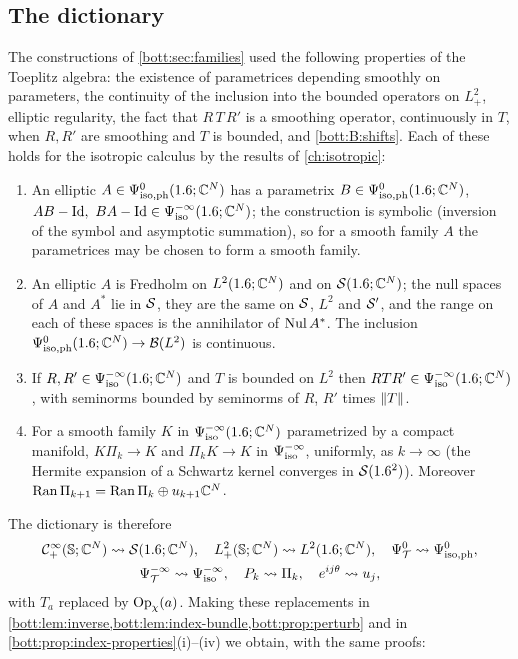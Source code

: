 \subsection{The dictionary}
The constructions of \cref{bott:sec:families} used the following properties of the
Toeplitz algebra: the existence of parametrices depending smoothly on parameters,
the continuity of the inclusion into the bounded operators on $L^2_+$, elliptic
regularity, the fact that $R\,T\,R'$ is a smoothing operator, continuously in $T$, when
$R,R'$ are smoothing and $T$ is bounded, and \ref{bott:B:shifts}. Each of these holds
for the isotropic calculus by the results of \cref{ch:isotropic}:
\begin{enumerate}[label=(I\arabic*),leftmargin=*]
\item\label{bott:I:parametrix} An elliptic $A\in\Psi^{0}_{\mathrm{iso,ph}}(1.6;\mathbb{C}^N)$ has a parametrix
  $B\in\Psi^{0}_{\mathrm{iso,ph}}(1.6;\mathbb{C}^N)$, $AB-\Id,\ BA-\Id\in\Psiiso{-\infty}(\R;\C^N)$; the
  construction is symbolic (inversion of the symbol and asymptotic summation), so for
  a smooth family $A$ the parametrices may be chosen to form a smooth family.
\item\label{bott:I:fredholm} An elliptic $A$ is Fredholm on $L^2(1.6;\mathbb{C}^N)$ and on
  $\mathcal{S}(1.6;\mathbb{C}^N)$; the null spaces of $A$ and $A^*$ lie in $\mathcal{S}$, they are the same on
  $\mathcal{S}$, $L^2$ and $\mathcal{S}'$, and the range on each of these spaces is the annihilator of
  $\operatorname{Nul} A^*$. The inclusion $\Psi^{0}_{\mathrm{iso,ph}}(1.6;\mathbb{C}^N)\to\mathcal{B}(L^2)$ is continuous.
\item\label{bott:I:corner} If $R,R'\in\Psi^{-\infty}_{\mathrm{iso}}(1.6;\mathbb{C}^N)$ and $T$ is bounded on
  $L^2$ then $RTR'\in\Psi^{-\infty}_{\mathrm{iso}}(1.6;\mathbb{C}^N)$, with seminorms bounded by seminorms of
  $R$, $R'$ times $\lVert T\rVert$.
\item\label{bott:I:hermite} For a smooth family $K$ in $\Psi^{-\infty}_{\mathrm{iso}}(1.6;\mathbb{C}^N)$
  parametrized by a compact manifold, $K\Pi_k\to K$ and $\Pi_kK\to K$ in
  $\Psi^{-\infty}_{\mathrm{iso}}$, uniformly, as $k\to\infty$ (the Hermite expansion of a Schwartz
  kernel converges in $\mathcal{S}(1.6^2)$). Moreover $\operatorname{Ran}\Pi_{k+1}=\operatorname{Ran}\Pi_k\oplus u_{k+1}\mathbb{C}^N$.
\end{enumerate}
The dictionary is therefore
\begin{gather*}
  \mathcal{C}^\infty_+(\mathbb{S};\mathbb{C}^N)\leadsto\mathcal{S}(1.6;\mathbb{C}^N),\quad L^2_+(\mathbb{S};\mathbb{C}^N)\leadsto L^2(1.6;\mathbb{C}^N),\quad
  \Psi^{0}_{\mathcal{T}}\leadsto\Psi^{0}_{\mathrm{iso,ph}},\\
  \Psi^{-\infty}_{\mathcal{T}}\leadsto\Psi^{-\infty}_{\mathrm{iso}},\quad
  P_k\leadsto\Pi_k,\quad e^{ij\theta}\leadsto u_j,
\end{gather*}
with $T_a$ replaced by $\operatorname{Op}_\chi(a)$. Making these replacements in
\cref{bott:lem:inverse,bott:lem:index-bundle,bott:prop:perturb} and in
\cref{bott:prop:index-properties}(i)--(iv) we obtain, with the same proofs:

